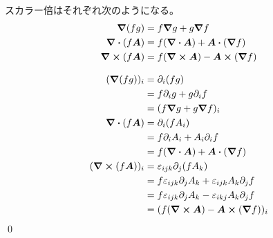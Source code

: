 \documentclass[uplatex,dvipdfmx,a4paper,11pt]{jlreq}
\makeatletter
\newcommand{\rot}{\curl}
\theoremstyle{definition}
\renewenvironment{proof}[1][\proofname]{\par
  \normalfont
  \topsep6\p@\@plus6\p@ \trivlist
  \item[\hskip\labelsep{\bfseries #1}\@addpunct{\bfseries}]\ignorespaces\quad\par
}{%
  \qed\endtrivlist\@endpefalse
}
\renewcommand\proofname{証明}
\makeatother
\begin{document}
\begin{theorem}[スカラー倍の勾配・発散・回転]
  スカラー倍はそれぞれ次のようになる。
  \begin{align}
    \grad{(fg)}     & = f\grad{g} + g\grad{f}                    \\
    \div{(f\bm{A})} & = f(\div{\bm{A}}) + \bm{A}\vdot(\grad{f})  \\
    \rot{(f\bm{A})} & = f(\rot{\bm{A}}) - \bm{A}\cross(\grad{f})
  \end{align}
\end{theorem}
\begin{proof}
  \begin{align}
    (\grad{(fg)})_i     & = \partial_i(fg)                                                    \\
                        & = f\partial_i g + g\partial_i f                                     \\
                        & = (f\grad{g} + g\grad{f})_i                                         \\
    \div{(f\bm{A})}     & = \partial_i(fA_i)                                                  \\
                        & = f\partial_iA_i + A_i\partial_if                                   \\
                        & = f(\div{\bm{A}}) + \bm{A}\vdot(\grad{f})                           \\
    (\rot{(f\bm{A})})_i & = \varepsilon_{ijk}\partial_j(fA_k)                                 \\
                        & = f\varepsilon_{ijk}\partial_jA_k + \varepsilon_{ijk}A_k\partial_jf \\
                        & = f\varepsilon_{ijk}\partial_jA_k - \varepsilon_{ikj}A_k\partial_jf \\
                        & = (f(\rot{\bm{A}}) - \bm{A}\cross(\grad{f}))_i
  \end{align}
\end{proof}
\end{document}
